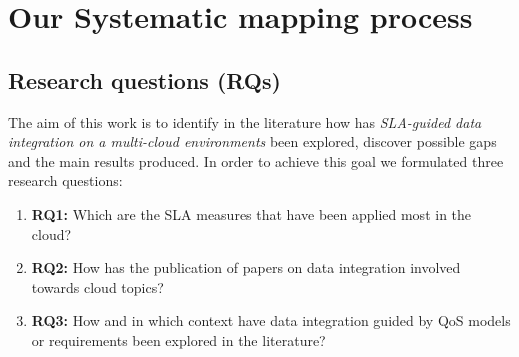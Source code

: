 \section{Our Systematic mapping process}\label{sec:sm}


 

 
  
\subsection{Research questions (RQs)}
The aim of this work is to identify in the literature how has \textit{SLA-guided
data integration on a multi-cloud environments} been explored, discover possible
gaps and the main results produced.    
In order to achieve this goal we formulated three research questions:
\begin{enumerate}
\item \textbf{RQ1:} Which are the SLA measures that have been applied most in
the cloud?
\item \textbf{RQ2:}  How has the publication of papers on data integration
involved towards cloud topics?
\item \textbf{RQ3:} How and in which context have data integration guided by QoS
models or requirements been explored in the literature?
\end{enumerate}

